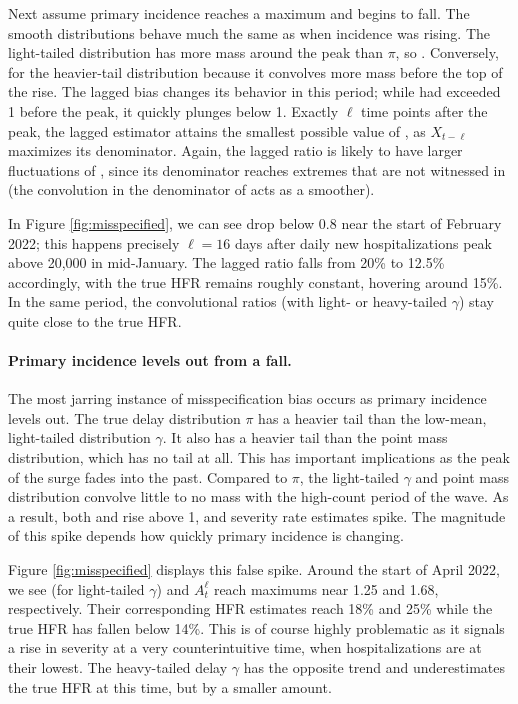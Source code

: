 \documentclass{article}
\begin{document}
Next assume primary incidence reaches a maximum and begins to fall. The smooth
distributions behave much the same as when incidence was rising. The light-tailed
distribution has more mass around the peak than $\pi$, so . Conversely,  for the heavier-tail distribution
because it convolves more mass before the top of the rise. The lagged bias
changes its behavior in this period; while  had exceeded 1
before the peak, it quickly plunges below 1. Exactly $\ell$ time points after 
the peak, the lagged estimator attains the smallest possible value of
, as $X_{t-\ell}$ maximizes its denominator. Again, the
lagged ratio is likely to have larger fluctuations of ,
since its denominator reaches extremes that are not witnessed in
 (the convolution in the denominator of 
 acts as a smoother).   

In Figure \ref{fig:misspecified}, we can see  drop below 0.8
near the start of February 2022; this happens precisely $\ell=16$ days after
daily new hospitalizations peak above 20,000 in mid-January. The lagged 
ratio falls from 20\% to 12.5\% accordingly, with the true HFR remains roughly
constant, hovering around 15\%. In the same period, the convolutional ratios
(with light- or heavy-tailed $\gamma$) stay quite close to the true HFR.   

\paragraph{Primary incidence levels out from a fall.}

The most jarring instance of misspecification bias occurs as primary incidence
levels out. The true delay distribution $\pi$ has a heavier tail than the
low-mean, light-tailed distribution $\gamma$. It also has a heavier tail than
the point mass distribution, which has no tail at all. This has important
implications as the peak of the surge fades into the past. Compared to $\pi$,
the light-tailed $\gamma$ and point mass distribution convolve little to no mass
with the high-count period of the wave. As a result, both   
and  rise above 1, and severity rate estimates spike. The
magnitude of this spike depends how quickly primary incidence is changing. 

Figure \ref{fig:misspecified} displays this false spike. Around the start of April 2022,
we see  (for light-tailed $\gamma$) and $A_t^\ell$ reach 
maximums near 1.25 and 1.68, respectively. Their corresponding HFR estimates reach
18\% and 25\% while the true HFR has fallen below 14\%. This is of course highly 
problematic as it signals a rise in severity at a very counterintuitive time,
when hospitalizations are at their lowest. The heavy-tailed delay $\gamma$ has
the opposite trend and underestimates the true HFR at this time, but by a
smaller amount. 
\end{document}
